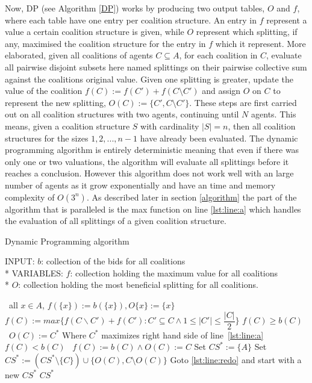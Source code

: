 \documentclass{llncs}
\begin{document}
Now, DP (see Algorithm  \ref{DP}) works by producing two output tables, $O$ and $f$, 
where each table have one entry per coalition structure. 
An entry in $f$ represent a value a certain coalition structure is given, 
while $O$ represent which splitting, if any, maximised the coalition structure for the entry in $f$ which it represent.
More elaborated, given all coalitions of agents $C\subseteq A$, for each coalition in $C$, evaluate all
pairwise disjoint subsets here named splittings on their pairwise collective sum against the coalitions
original value. Given one splitting is greater, update the value of the coalition $f(C) := f(C') + f(C\setminus C')$
and assign $O$ on $C$ to represent the new splitting, $O(C) := \{C',C\setminus C'\}$. These steps are first carried out on all coalition structures with two agents, continuing until $N$ agents.  This means, given a coalition structure $S$ with cardinality $|S| = n$, then all coalition structures
for the sizes $1,2,...,n-1$ have already been evaluated. The dynamic programming algorithm is entirely deterministic meaning that even if there was only one or two valuations, the algorithm will evaluate all splittings before it reaches a conclusion. However this algorithm does not work well with an large number of agents as it grow exponentially and have an time and memory complexity of $O(3^n)$. As described later in section \ref{algorithm} the part of the algorithm that is paralleled is the max function on line \ref{lst:line:a} which handles the evaluation of all splittings of a given coalition structure.

\begin{algorithm}
\caption{Dynamic Programming algorithm \label{DP}}
INPUT: $b$: collection of the bids for all coalitions\\*
VARIABLES: $f$: collection holding the maximum value for all coalitions\\*
$O$: collection holding the most beneficial splitting for all coalitions.
\begin{algorithmic}[1]
\STATE\algorithmicfor\ all $x \in A$, \algorithmicdo  $f(\{x\}):= b(\{x\}),O\{x\}:= \{x\}$ \algorithmicendfor
{}
\STATE $f(C) := max\{f(C\backslash C')+f(C'):C'\subseteq C \wedge 1 \leq \vert C' \vert \leq \dfrac{\vert C \vert}{2}\}$ \label{lst:line:a}
\STATE\algorithmicif $f(C) \geq b(C)$ \algorithmicthen\ $O(C) := C^{*}$ \hfill Where $C^{*}$ maximizes right hand side of line~\ref{lst:line:a} \algorithmicendif
\STATE\algorithmicif $f(C) < b(C)$ \algorithmicthen\ $f(C) := b(C)\wedge O(C) := C$ \algorithmicendif
\ENDFOR
\ENDFOR
\STATE Set $CS^* := \{A\}$
 \label{lst:line:redo}
\STATE Set $CS^* := (CS^*\setminus \{C\})\cup \{O(C),C\setminus O(C)\}$ 
\STATE Goto \ref{lst:line:redo} and start with a new $CS^*$
\ENDIF
\ENDFOR
\RETURN $CS^*$
\end{algorithmic}
\end{algorithm}
\end{document}
